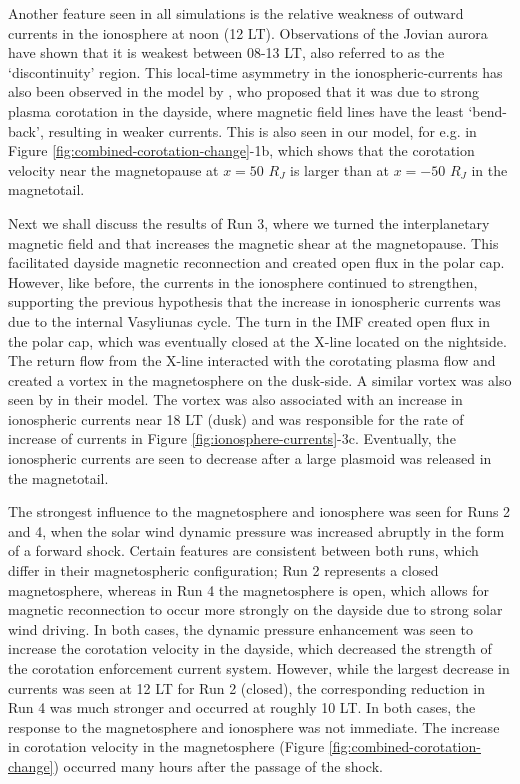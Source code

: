 Another feature seen in all simulations is the relative weakness of outward currents in the ionosphere at noon (12 LT). Observations of the Jovian aurora have shown that it is weakest between 08-13 LT, also referred to as the `discontinuity' region. This local-time asymmetry in the ionospheric-currents has also been observed in the model by , who proposed that it was due to strong plasma corotation in the dayside, where magnetic field lines have the least `bend-back', resulting in weaker currents. This is also seen in our model, for e.g. in Figure \ref{fig:combined-corotation-change}-1b, which shows that the corotation velocity near the magnetopause at $x=50$ $R_J$ is larger than at $x=-50$ $R_J$ in the magnetotail. 

Next we shall discuss the results of Run 3, where we turned the interplanetary magnetic field and that increases the magnetic shear at the magnetopause. This facilitated dayside magnetic reconnection and created open flux in the polar cap. However, like before, the currents in the ionosphere continued to strengthen, supporting the previous hypothesis that the increase in ionospheric currents was due to the internal Vasyliunas cycle. The turn in the IMF created open flux in the polar cap, which was eventually closed at the X-line located on the nightside. The return flow from the X-line interacted with the corotating plasma flow and created a vortex in the magnetosphere on the dusk-side. A similar vortex was also seen by  in their model. The vortex was also associated with an increase in ionospheric currents near 18 LT (dusk) and was responsible for the rate of increase of currents in Figure \ref{fig:ionosphere-currents}-3c. Eventually, the ionospheric currents are seen to decrease after a large plasmoid was released in the magnetotail.

The strongest influence to the magnetosphere and ionosphere was seen for Runs 2 and 4, when the solar wind dynamic pressure was increased abruptly in the form of a forward shock. Certain features are consistent between both runs, which differ in their magnetospheric configuration; Run 2 represents a closed magnetosphere, whereas in Run 4 the magnetosphere is open, which allows for magnetic reconnection to occur more strongly on the dayside due to strong solar wind driving. In both cases, the dynamic pressure enhancement was seen to increase the corotation velocity in the dayside, which decreased the strength of the corotation enforcement current system. However, while the largest decrease in currents was seen at 12 LT for Run 2 (closed), the corresponding reduction in Run 4 was much stronger and occurred at roughly 10 LT. In both cases, the response to the magnetosphere and ionosphere was not immediate. The increase in corotation velocity in the magnetosphere (Figure \ref{fig:combined-corotation-change}) occurred many hours after the passage of the shock. 

